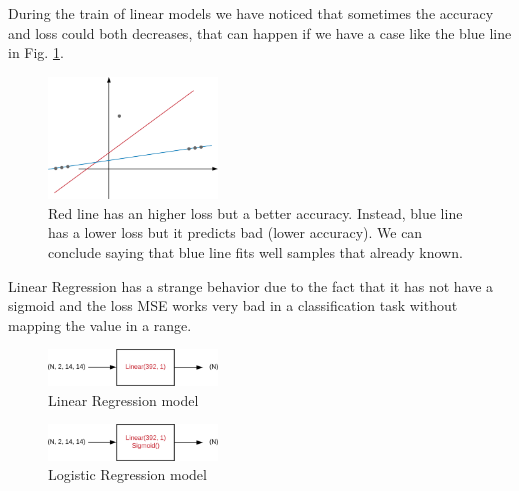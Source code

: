 \documentclass[journal, a4paper]{IEEEtran}
\begin{document}
During the train of linear models we have noticed that sometimes the accuracy and loss could both decreases, that can happen if we have a case like the blue line in Fig. \ref{fig:lossacc}. 
\begin{figure}[!h]
    \centering
    \includegraphics[width=0.4\textwidth]{lossacc.png}
    \caption{Red line has an higher loss but a better accuracy. Instead, blue line has a lower loss but it predicts bad (lower accuracy). We can conclude saying that blue line fits well samples that already known.}
    \label{fig:lossacc}
\end{figure}
Linear Regression has a strange behavior due to the fact that it has not have a sigmoid and the loss MSE works very bad in a classification task without mapping the value in a range.

\begin{figure}[!h]
    \centering
    \includegraphics[width=0.4\textwidth]{linearregression.png}
    \caption{Linear Regression model}
    \label{fig:linearregression}
\end{figure}

\begin{figure}[!h]
    \centering
    \includegraphics[width=0.4\textwidth]{logistic.png}
    \caption{Logistic Regression model}
    \label{fig:logisticregression}
\end{figure}
\end{document}
